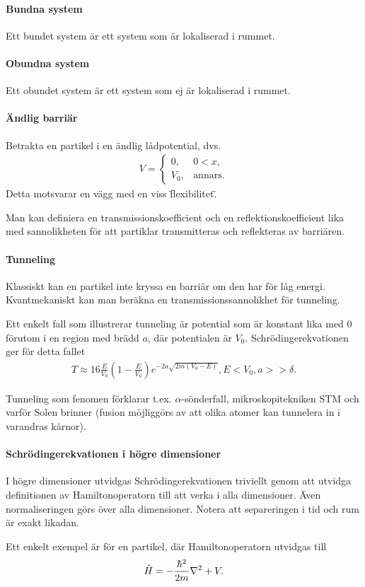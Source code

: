 \paragraph{Bundna system}
Ett bundet system är ett system som är lokaliserad i rummet.

\paragraph{Obundna system}
Ett obundet system är ett system som ej är lokaliserad i rummet.

\paragraph{Ändlig barriär}
Betrakta en partikel i en ändlig lådpotential, dvs.
\begin{align*}
	V = 
	\begin{cases}
		0,      &0 < x, \\
		V_{0},  &\text{annars.}
	\end{cases}
\end{align*}
Detta motsvarar en vägg med en viss \"flexibilitet\".

Man kan definiera en transmissionskoefficient och en reflektionskoefficient lika med sannolikheten för att partiklar transmitteras och reflekteras av barriären.

\paragraph{Tunneling}
Klassiskt kan en partikel inte kryssa en barriär om den har för låg energi. Kvantmekaniskt kan man beräkna en transmissionssannolikhet för tunneling.

Ett enkelt fall som illustrerar tunneling är potential som är konstant lika med $0$ förutom i en region med brädd $a$, där potentialen är $V_{0}$. Schrödingerekvationen ger för detta fallet
\begin{align*}
	T \approx 16\frac{E}{V_{0}}\left(1 - \frac{E}{V_{0}}\right)e^{-2a\sqrt{2m(V_{0} - E)}}, E < V_{0}, a >> \delta.
\end{align*}

Tunneling som fenomen förklarar t.ex. $\alpha$-sönderfall, mikroskopitekniken STM och varför Solen brinner (fusion möjliggörs av att olika atomer kan tunnelera in i varandras kärnor).

\paragraph{Schrödingerekvationen i högre dimensioner}
I högre dimensioner utvidgas Schrödingerekvationen triviellt genom att utvidga definitionen av Hamiltonoperatorn till att verka i alla dimensioner. Även normaliseringen görs över alla dimensioner. Notera att separeringen i tid och rum är exakt likadan.

Ett enkelt exempel är för en partikel, där Hamiltonoperatorn utvidgas till
\begin{align*}
	\hat{H} = -\frac{\hbar^{2}}{2m}\laplacian + V.
\end{align*}